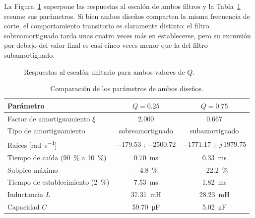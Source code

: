 La Figura~\ref{fig:escalon-comparacion} superpone las respuestas al escalón de ambos filtros y la
Tabla~\ref{tab:comparacion} resume sus parámetros. Si bien ambos diseños comparten la misma frecuencia de
corte, el comportamiento transitorio es claramente distinto: el filtro sobreamortiguado tarda unas cuatro
veces más en establecerse, pero su excursión por debajo del valor final es casi cinco veces menor que la
del filtro subamortiguado.

\begin{figure}[!ht]
  \centering
  
  \caption{Respuestas al escalón unitario para ambos valores de $Q$.}
  \label{fig:escalon-comparacion}
\end{figure}

\begin{table}[!ht]
  \centering
  \begin{tabular}{|l|c|c|}
    \hline
    Parámetro & $Q = \num{0.25}$ & $Q = \num{0.75}$ \\
    \hline
    Factor de amortiguamiento $\xi$                          & \num{2.000} & \num{0.667} \\
    Tipo de amortiguamiento                                   & sobreamortiguado & subamortiguado \\
    Raíces [\unit{\radian\per\second}]                        & $\num{-179.53}$ ; $\num{-2500.72}$
                                                              & $\num{-1771.17} \pm j\,\num{1979.75}$ \\
    Tiempo de caída (\qty{90}{\percent} a \qty{10}{\percent}) & \qty{0.70}{\milli\second}
                                                              & \qty{0.33}{\milli\second} \\
    Subpico máximo                                            & \qty{-4.8}{\percent} & \qty{-22.2}{\percent} \\
    Tiempo de establecimiento (\qty{2}{\percent})             & \qty{7.53}{\milli\second} & \qty{1.82}{\milli\second} \\
    Inductancia $L$                                           & \qty{37.31}{\milli\henry} & \qty{28.23}{\milli\henry} \\
    Capacidad $C$                                             & \qty{59.70}{\micro\farad} & \qty{5.02}{\micro\farad} \\
    \hline
  \end{tabular}
  \caption{Comparación de los parámetros de ambos diseños.}
  \label{tab:comparacion}
\end{table}

